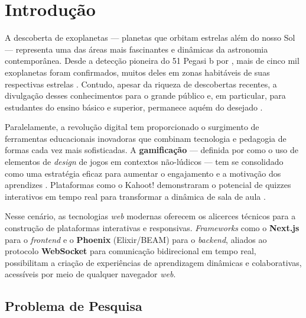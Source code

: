 \documentclass[
	12pt,
	openany,
	oneside,
	a4paper,
	english,
	brazil
]{abntex2}
\begin{document}
\tableofcontents*
\clearpage

\textual

\chapter{Introdução}\label{cap:introducao}

A descoberta de exoplanetas --- planetas que orbitam estrelas além do nosso Sol --- representa uma das áreas mais fascinantes e dinâmicas da astronomia contemporânea. Desde a detecção pioneira do 51 Pegasi b por , mais de cinco mil exoplanetas foram confirmados, muitos deles em zonas habitáveis de suas respectivas estrelas \cite{nasaexoplanet2024}. Contudo, apesar da riqueza de descobertas recentes, a divulgação desses conhecimentos para o grande público e, em particular, para estudantes do ensino básico e superior, permanece aquém do desejado \cite{langhi2009}.

Paralelamente, a revolução digital tem proporcionado o surgimento de ferramentas educacionais inovadoras que combinam tecnologia e pedagogia de formas cada vez mais sofisticadas. A \textbf{gamificação} --- definida por  como o uso de elementos de \textit{design} de jogos em contextos não-lúdicos --- tem se consolidado como uma estratégia eficaz para aumentar o engajamento e a motivação dos aprendizes \cite{hamari2014, kapp2012}. Plataformas como o Kahoot! demonstraram o potencial de quizzes interativos em tempo real para transformar a dinâmica de sala de aula \cite{wang2020kahoot, licorish2018}.

Nesse cenário, as tecnologias \textit{web} modernas oferecem os alicerces técnicos para a construção de plataformas interativas e responsivas. \textit{Frameworks} como o \textbf{Next.js} para o \textit{frontend} e o \textbf{Phoenix} (Elixir/BEAM) para o \textit{backend}, aliados ao protocolo \textbf{WebSocket} para comunicação bidirecional em tempo real, possibilitam a criação de experiências de aprendizagem dinâmicas e colaborativas, acessíveis por meio de qualquer navegador \textit{web}.

\section{Problema de Pesquisa}
\end{document}
